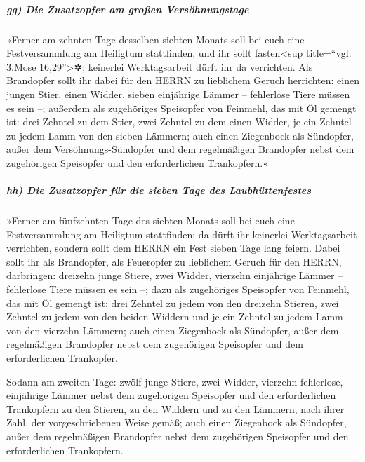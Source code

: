 \hypertarget{gg-die-zusatzopfer-am-grouxdfen-versuxf6hnungstage}{%
\subparagraph{gg) Die Zusatzopfer am großen
Versöhnungstage}\label{gg-die-zusatzopfer-am-grouxdfen-versuxf6hnungstage}}

»Ferner am zehnten Tage desselben siebten Monats soll bei
euch eine Festversammlung am Heiligtum stattfinden, und ihr sollt
fasten\textless sup title=``vgl. 3.Mose 16,29''\textgreater✲; keinerlei
Werktagsarbeit dürft ihr da verrichten. Als Brandopfer
sollt ihr dabei für den HERRN zu lieblichem Geruch herrichten: einen
jungen Stier, einen Widder, sieben einjährige Lämmer -- fehlerlose Tiere
müssen es sein --; außerdem als zugehöriges Speisopfer von
Feinmehl, das mit Öl gemengt ist: drei Zehntel zu dem Stier, zwei
Zehntel zu dem einen Widder, je ein Zehntel zu jedem Lamm
von den sieben Lämmern; auch einen Ziegenbock als
Sündopfer, außer dem Versöhnungs-Sündopfer und dem regelmäßigen
Brandopfer nebst dem zugehörigen Speisopfer und den erforderlichen
Trankopfern.«

\hypertarget{hh-die-zusatzopfer-fuxfcr-die-sieben-tage-des-laubhuxfcttenfestes}{%
\subparagraph{hh) Die Zusatzopfer für die sieben Tage des
Laubhüttenfestes}\label{hh-die-zusatzopfer-fuxfcr-die-sieben-tage-des-laubhuxfcttenfestes}}

»Ferner am fünfzehnten Tage des siebten Monats soll bei
euch eine Festversammlung am Heiligtum stattfinden; da dürft ihr
keinerlei Werktagsarbeit verrichten, sondern sollt dem HERRN ein Fest
sieben Tage lang feiern. Dabei sollt ihr als Brandopfer,
als Feueropfer zu lieblichem Geruch für den HERRN, darbringen: dreizehn
junge Stiere, zwei Widder, vierzehn einjährige Lämmer -- fehlerlose
Tiere müssen es sein --; dazu als zugehöriges Speisopfer
von Feinmehl, das mit Öl gemengt ist: drei Zehntel zu jedem von den
dreizehn Stieren, zwei Zehntel zu jedem von den beiden Widdern
und je ein Zehntel zu jedem Lamm von den vierzehn
Lämmern; auch einen Ziegenbock als Sündopfer, außer dem
regelmäßigen Brandopfer nebst dem zugehörigen Speisopfer und dem
erforderlichen Trankopfer.

Sodann am zweiten Tage: zwölf junge Stiere, zwei Widder,
vierzehn fehlerlose, einjährige Lämmer nebst dem
zugehörigen Speisopfer und den erforderlichen Trankopfern zu den
Stieren, zu den Widdern und zu den Lämmern, nach ihrer Zahl, der
vorgeschriebenen Weise gemäß; auch einen Ziegenbock als
Sündopfer, außer dem regelmäßigen Brandopfer nebst dem zugehörigen
Speisopfer und den erforderlichen Trankopfern.


